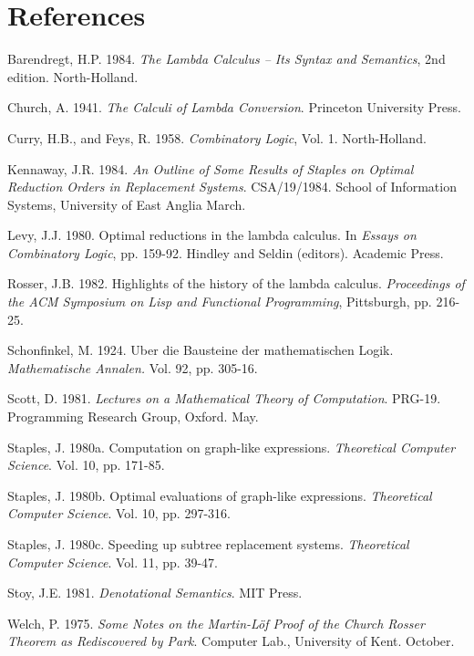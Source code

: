 \section*{References}
\begin{references}
\item Barendregt, H.P. 1984. \textit{The Lambda Calculus -- Its Syntax and Semantics}, 2nd edition.
North-Holland.
\item Church, A. 1941. \textit{The Calculi of Lambda Conversion}. Princeton University Press.
\item Curry, H.B., and Feys, R. 1958. \textit{Combinatory Logic}, Vol. 1. North-Holland.
\item Kennaway, J.R. 1984. \textit{An Outline of Some Results of Staples on Optimal Reduction
Orders in Replacement Systems}. CSA/19/1984. School of Information Systems,
University of East Anglia March.
\item Levy, J.J. 1980. Optimal reductions in the lambda calculus. In \textit{Essays on Combinatory
Logic}, pp. 159-92. Hindley and Seldin (editors). Academic Press.
\item Rosser, J.B. 1982. Highlights of the history of the lambda calculus. \textit{Proceedings of the
ACM Symposium on Lisp and Functional Programming}, Pittsburgh, pp. 216-25.
\item Schonfinkel, M. 1924. Uber die Bausteine der mathematischen Logik. \textit{Mathematische
Annalen.} Vol. 92, pp. 305-16.
\item Scott, D. 1981. \textit{Lectures on a Mathematical Theory of Computation}. PRG-19.
Programming Research Group, Oxford. May.
\item Staples, J. 1980a. Computation on graph-like expressions. \textit{Theoretical Computer Science}. Vol. 10, pp. 171-85.
\item Staples, J. 1980b. Optimal evaluations of graph-like expressions. \textit{Theoretical Computer Science}. Vol. 10, pp. 297-316.
\item Staples, J. 1980c. Speeding up subtree replacement systems. \textit{Theoretical Computer Science}. Vol. 11, pp. 39-47.
\item Stoy, J.E. 1981. \textit{Denotational Semantics}. MIT Press.
\item Welch, P. 1975. \textit{Some Notes on the Martin-L\"of Proof of the Church Rosser Theorem as Rediscovered by Park}. Computer Lab., University of Kent. October.
\end{references}
